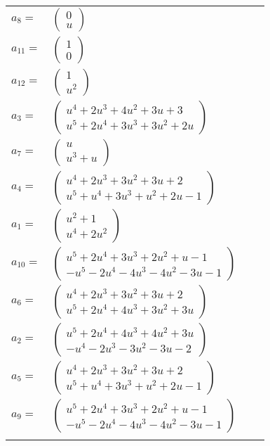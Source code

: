 \documentclass[1p]{elsarticle_modified}
\theoremstyle{definition}
\begin{document}
\begin{tabular}{m{7pt} m{180pt} m{7pt} m{180pt} }
\flushright $a_{8}=$&$\begin{pmatrix}0\\u\end{pmatrix}$ \\
\flushright $a_{11}=$&$\begin{pmatrix}1\\0\end{pmatrix}$ \\
\flushright $a_{12}=$&$\begin{pmatrix}1\\u^2\end{pmatrix}$ \\
\flushright $a_{3}=$&$\begin{pmatrix}u^4+2 u^3+4 u^2+3 u+3\\u^5+2 u^4+3 u^3+3 u^2+2 u\end{pmatrix}$ \\
\flushright $a_{7}=$&$\begin{pmatrix}u\\u^3+u\end{pmatrix}$ \\
\flushright $a_{4}=$&$\begin{pmatrix}u^4+2 u^3+3 u^2+3 u+2\\u^5+u^4+3 u^3+u^2+2 u-1\end{pmatrix}$ \\
\flushright $a_{1}=$&$\begin{pmatrix}u^2+1\\u^4+2 u^2\end{pmatrix}$ \\
\flushright $a_{10}=$&$\begin{pmatrix}u^5+2 u^4+3 u^3+2 u^2+u-1\\- u^5-2 u^4-4 u^3-4 u^2-3 u-1\end{pmatrix}$ \\
\flushright $a_{6}=$&$\begin{pmatrix}u^4+2 u^3+3 u^2+3 u+2\\u^5+2 u^4+4 u^3+3 u^2+3 u\end{pmatrix}$ \\
\flushright $a_{2}=$&$\begin{pmatrix}u^5+2 u^4+4 u^3+4 u^2+3 u\\- u^4-2 u^3-3 u^2-3 u-2\end{pmatrix}$ \\
\flushright $a_{5}=$&$\begin{pmatrix}u^4+2 u^3+3 u^2+3 u+2\\u^5+u^4+3 u^3+u^2+2 u-1\end{pmatrix}$ \\
\flushright $a_{9}=$&$\begin{pmatrix}u^5+2 u^4+3 u^3+2 u^2+u-1\\- u^5-2 u^4-4 u^3-4 u^2-3 u-1\end{pmatrix}$\\&\end{tabular}
\end{document}
